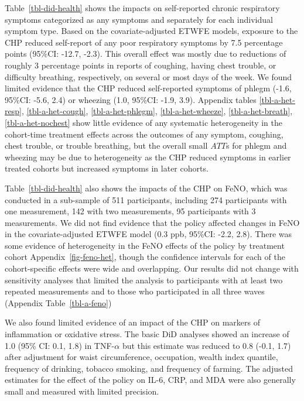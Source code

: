 \documentclass[
  letterpaper,
  DIV=11,
  numbers=noendperiod]{scrartcl}
\begin{document}
Table~\ref{tbl-did-health} shows the impacts on self-reported chronic
respiratory symptoms categorized as any symptoms and separately for each
individual symptom type. Based on the covariate-adjusted ETWFE models,
exposure to the CHP reduced self-report of any poor respiratory symptoms
by 7.5 percentage points (95\%CI: -12.7, -2.3). This overall effect was
mostly due to reductions of roughly 3 percentage points in reports of
coughing, having chest trouble, or difficulty breathing, respectively,
on several or most days of the week. We  found limited
evidence that the CHP reduced self-reported symptoms of phlegm (-1.6,
95\%CI: -5.6, 2.4) or wheezing (1.0, 95\%CI: -1.9, 3.9). Appendix tables
\ref{tbl-a-het-resp}, \ref{tbl-a-het-cough}, \ref{tbl-a-het-phlegm},
\ref{tbl-a-het-wheeze}, \ref{tbl-a-het-breath}, \ref{tbl-a-het-nochest}
show little evidence of any systematic heterogeneity in the cohort-time
treatment effects across the outcomes of any symptom, coughing, chest
trouble, or trouble breathing, but the overall small \(ATT\)s for phlegm
and wheezing may be due to heterogeneity as the CHP reduced symptoms in
earlier treated cohorts but increased symptoms in later cohorts.

Table~\ref{tbl-did-health} also shows the impacts of the CHP on FeNO,
which was conducted in a sub-sample of 511 participants, including 274
participants with one measurement, 142 with two measurements, 95
participants with 3 measurements. We did not find evidence that the
policy affected changes in FeNO in the covariate-adjusted ETWFE
model (0.3 ppb, 95\%CI: -2.2, 2.8). There was some
evidence of heterogeneity in the FeNO effects of the policy by treatment
cohort Appendix~\ref{fig-feno-het}, though the confidence intervals for
each of the cohort-specific effects were wide and overlapping. Our
results did not change with sensitivity analyses that limited the
analysis to participants with at least two repeated measurements and to
those who participated in all three waves (Appendix
Table~\ref{tbl-a-feno})

We also found limited evidence of an impact of the CHP on
markers of inflammation or oxidative stress. The basic DiD analyses
showed an increase of 1.0 (95\% CI: 0.1, 1.8) in TNF-\(\alpha\) but this
estimate was reduced to 0.8 (-0.1, 1.7) after adjustment for waist
circumference, occupation, wealth index quantile, frequency of drinking,
tobacco smoking, and frequency of farming. The adjusted estimates for
the effect of the policy on IL-6, CRP, and MDA were also generally small
and measured with limited precision.
\end{document}

